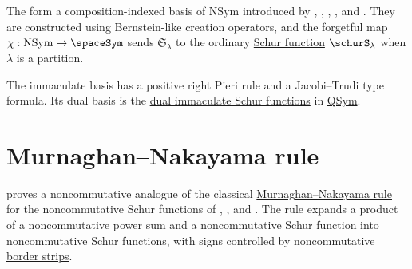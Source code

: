 The \label{immaculateSchurFunctionDefinition}
form a composition-indexed basis of
$\mathrm{NSym}$ introduced by , ,
, , and 
\cite{BergBergeronSaliolaSerranoZabrocki2014}.  They are constructed using
Bernstein-like creation operators, and the forgetful map
$\chi:\mathrm{NSym}\to\spaceSym$ sends $\mathfrak{S}_\lambda$ to the ordinary
\hyperref[schurS]{Schur function} $\schurS_\lambda$ when $\lambda$ is a
partition.

The immaculate basis has a positive right Pieri rule and a Jacobi--Trudi type
formula.  Its dual basis is the \hyperref[diSchur]{dual immaculate Schur
functions} in \hyperref[quasiSymmetricFunctions]{QSym}.

\section[nonComMNrule]{Murnaghan--Nakayama rule}

 proves a noncommutative analogue of the classical
\hyperref[murnaghanNakayamaRule]{Murnaghan--Nakayama rule} for the
noncommutative Schur functions of ,
, and  \cite{Tewari2016}.
The rule expands a product of a noncommutative power sum and a
noncommutative Schur function into noncommutative Schur functions, with signs
controlled by noncommutative \hyperref[borderStrip]{border strips}.
